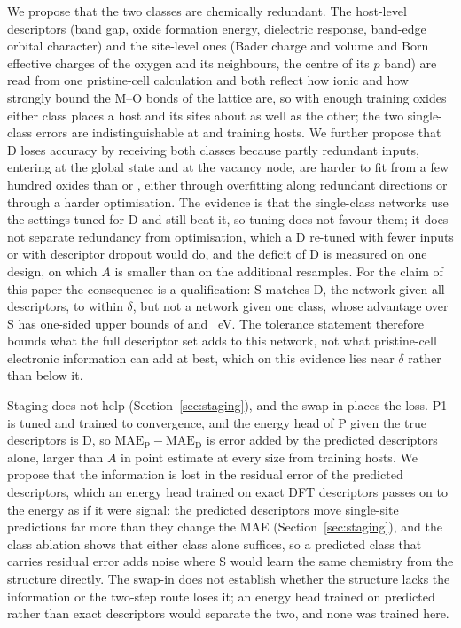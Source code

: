 We propose that the two classes are chemically redundant. The host-level descriptors (band gap, oxide formation energy, dielectric response, band-edge orbital character) and the site-level ones (Bader charge and volume and Born effective charges of the oxygen and its neighbours, the centre of its $p$ band) are read from one pristine-cell calculation and both reflect how ionic and how strongly bound the M--O bonds of the lattice are, so with enough training oxides either class places a host and its sites about as well as the other; the two single-class errors are indistinguishable at \numCfgBudgetsHostsItemFive{} and \numCfgBudgetsMax{} training hosts. We further propose that D loses accuracy by receiving both classes because \numRfElectronicNFeatures{} partly redundant inputs, entering at the global state and at the vacancy node, are harder to fit from a few hundred oxides than \numNetDescriptorsSite{} or \numNetDescriptorsHost{}, either through overfitting along redundant directions or through a harder optimisation. The evidence is that the single-class networks use the settings tuned for D and still beat it, so tuning does not favour them; it does not separate redundancy from optimisation, which a D re-tuned with fewer inputs or with descriptor dropout would do, and the deficit of D is measured on one design, on which $A$ is smaller than on the additional resamples. For the claim of this paper the consequence is a qualification: S matches D, the network given all \numRfElectronicNFeatures{} descriptors, to within $\delta$, but not a network given one class, whose advantage over S has one-sided upper bounds of \numNetDclassSixHundredFiftyFourGapSHostUpper{} and \numNetDclassSixHundredFiftyFourGapSSiteUpper{}~eV. The tolerance statement therefore bounds what the full descriptor set adds to this network, not what pristine-cell electronic information can add at best, which on this evidence lies near $\delta$ rather than below it.

Staging does not help (Section~\ref{sec:staging}), and the swap-in places the loss. P1 is tuned and trained to convergence, and the energy head of P given the true descriptors is D, so $\mathrm{MAE}_\mathrm{P} - \mathrm{MAE}_\mathrm{D}$ is error added by the predicted descriptors alone, larger than $A$ in point estimate at every size from \numCfgBudgetsHostsItemThree{} training hosts. We propose that the information is lost in the residual error of the predicted descriptors, which an energy head trained on exact DFT descriptors passes on to the energy as if it were signal: the predicted descriptors move single-site predictions far more than they change the MAE (Section~\ref{sec:staging}), and the class ablation shows that either class alone suffices, so a predicted class that carries residual error adds noise where S would learn the same chemistry from the structure directly. The swap-in does not establish whether the structure lacks the information or the two-step route loses it; an energy head trained on predicted rather than exact descriptors would separate the two, and none was trained here.

